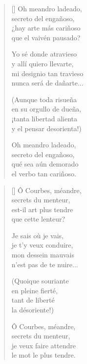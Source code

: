 




\bigskip

\begin{verse}[\versewidth]
  Oh meandro ladeado, \\
  secreto del engañoso, \\
  ¿hay arte más cariñoso \\
  que el vaivén pausado?

  Yo sé donde atravieso \\
  y allí quiero llevarte, \\
  mi designio tan travieso \\
  nunca será de dañarte...

  (Aunque toda risueña \\
  en su orgullo de dueña, \\
  ¡tanta libertad alienta \\
  y el pensar desorienta!)

  Oh meandro ladeado, \\
  secreto del engañoso, \\
  qué sea aún demorado \\
  el verbo tan cariñoso.
\end{verse}

\newpage



\settowidth{\versewidth}{N'est pas de te nuire...}

\bigskip

{\itshape
\begin{verse}[\versewidth]
Ô Courbes, méandre, \\
secrets du menteur, \\
est-il art plus tendre \\
que cette lenteur?

Je sais où je vais, \\
je t'y veux conduire, \\
mon dessein mauvais \\
n'est pas de te nuire...

(Quoique souriante \\
en pleine fierté, \\
tant de liberté \\
la désoriente!)

Ô Courbes, méandre, \\
secrets du menteur, \\
je veux faire attendre \\
le mot le plus tendre.
\end{verse}
}

